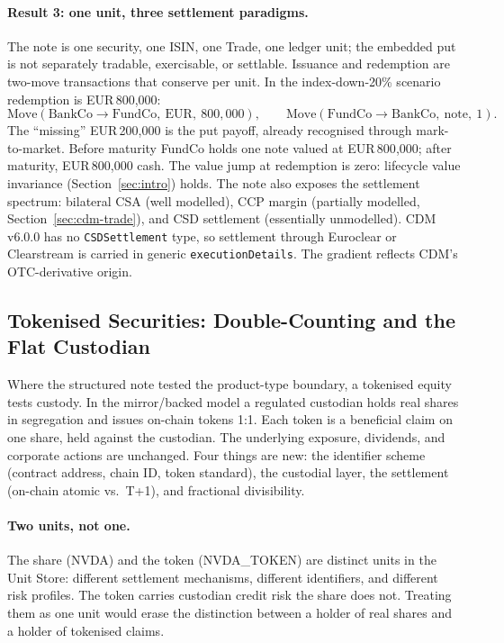 \paragraph{Result 3: one unit, three settlement paradigms.} The note is one security, one ISIN, one Trade, one ledger unit; the embedded put is not separately tradable, exercisable, or settlable. Issuance and redemption are two-move transactions that conserve per unit. In the index-down-20\% scenario redemption is EUR\,800{,}000:
\[
\text{Move}(\text{BankCo}\to\text{FundCo},\ \text{EUR},\ 800{,}000),\qquad
\text{Move}(\text{FundCo}\to\text{BankCo},\ \text{note},\ 1).
\]
The ``missing'' EUR\,200{,}000 is the put payoff, already recognised through mark-to-market. Before maturity FundCo holds one note valued at EUR\,800{,}000; after maturity, EUR\,800{,}000 cash. The value jump at redemption is zero: lifecycle value invariance (Section~\ref{sec:intro}) holds. The note also exposes the settlement spectrum: bilateral CSA (well modelled), CCP margin (partially modelled, Section~\ref{sec:cdm-trade}), and CSD settlement (essentially unmodelled). CDM v6.0.0 has no \texttt{CSDSettlement} type, so settlement through Euroclear or Clearstream is carried in generic \texttt{executionDetails}. The gradient reflects CDM's OTC-derivative origin.

\subsection{Tokenised Securities: Double-Counting and the Flat Custodian}
\label{sec:cdm-tokenized}

Where the structured note tested the product-type boundary, a tokenised equity tests custody. In the mirror/backed model a regulated custodian holds real shares in segregation and issues on-chain tokens 1:1. Each token is a beneficial claim on one share, held against the custodian. The underlying exposure, dividends, and corporate actions are unchanged. Four things are new: the identifier scheme (contract address, chain ID, token standard), the custodial layer, the settlement (on-chain atomic vs.\ T+1), and fractional divisibility.

\paragraph{Two units, not one.} The share (NVDA) and the token (NVDA\_TOKEN) are distinct units in the Unit Store: different settlement mechanisms, different identifiers, and different risk profiles. The token carries custodian credit risk the share does not. Treating them as one unit would erase the distinction between a holder of real shares and a holder of tokenised claims.

